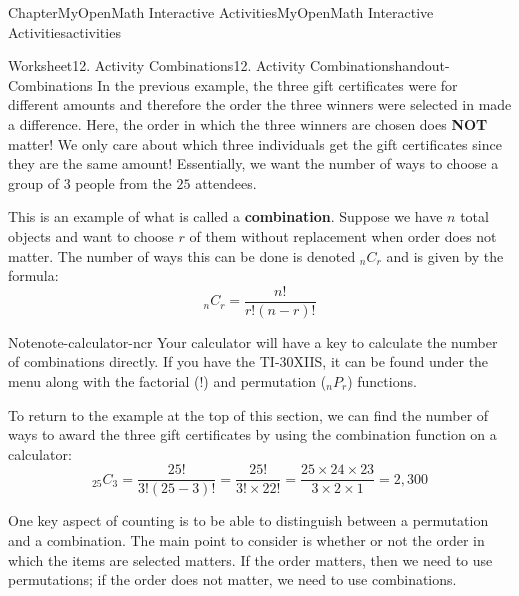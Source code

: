 \documentclass[oneside,10pt,]{book}
\newcommand{\blocktitlefont}{\relax}
\newcommand{\ptxlistdisc}{\raisebox{0.3ex}{\textbullet}}
\newcommand{\terminology}[1]{\textbf{#1}}
\newlength{\fillinmaxwidth}
\newlength{\fillincontract}
\newlength{\charmaxwidth}\setlength{\charmaxwidth}{0.5em}
\newlength{\charminwidth}\setlength{\charminwidth}{0.1em}
\newlength{\fillinheight}
\newcommand{\fillintext}[1]{%
\setlength{\fillinmaxwidth}{#1\charmaxwidth}%
\setlength{\fillincontract}{#1\charminwidth}%
\setlength{\fillinheight}{\baselineskip}\addtolength{\fillinheight}{1.2pt}%
\strut\nobreak\leaders\vbox{\hrule width 0.3pt height 0.3pt \vskip -1.2pt}\hskip 1\fillinmaxwidth minus \fillincontract\nobreak\strut%
}
\newcommand{\kbd}[1]{\keys{{#1}}}
\begin{document}
\begin{chapterptx}{Chapter}{MyOpenMath Interactive Activities}{}{MyOpenMath Interactive Activities}{}{}{activities}
\begin{worksheet-section}{Worksheet}{12. Activity Combinations}{}{12. Activity Combinations}{}{}{handout-Combinations}
In the previous example, the three gift certificates were for different amounts and therefore the order the three winners were selected in made a difference. Here, the order in which the three winners are chosen does \terminology{NOT} matter! We only care about which three individuals get the gift certificates since they are the same amount! Essentially, we want the number of ways to choose a group of \(3\) people from the \(25\) attendees.%
\par
This is an example of what is called a \terminology{combination}. Suppose we have \(n\) total objects and want to choose \(r\) of them without replacement when order does not matter. The number of ways this can be done is denoted \(_nC_r\) and is given by the formula:%
\begin{equation*}
_nC_r = \frac{n!}{r!(n-r)!}
\end{equation*}
%
\begin{note}{Note}{}{note-calculator-ncr}%
Your calculator will have a key to calculate the number of combinations directly. If you have the TI-30XIIS, it can be found under the \kbd{PRB} menu along with the factorial (\(!\)) and permutation (\(_nP_r\)) functions.%
\end{note}
To return to the example at the top of this section, we can find the number of ways to award the three gift certificates by using the combination function on a calculator:%
\begin{equation*}
_{25}C_{3} = \frac{25!}{3!(25-3)!} = \frac{25!}{3! \times 22!} = \frac{25 \times 24 \times 23}{3 \times 2 \times 1} = 2,300
\end{equation*}
%
%
\clearpage
One key aspect of counting is to be able to distinguish between a permutation and a combination. The main point to consider is whether or not the order in which the items are selected matters. If the order matters, then we need to use permutations; if the order does not matter, we need to use combinations.%

\end{worksheet-section}
\end{chapterptx}
\end{document}
